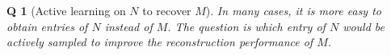\documentclass{article} %
\newtheorem{question}{Q}
\begin{document}
\begin{question}[Active learning on $N$ to recover $M$]
In many cases, it is more easy to obtain entries of $N$ instead of $M$. The question is which entry of $N$ would be actively sampled to improve the reconstruction performance of $M$.
\end{question}





\end{document}
